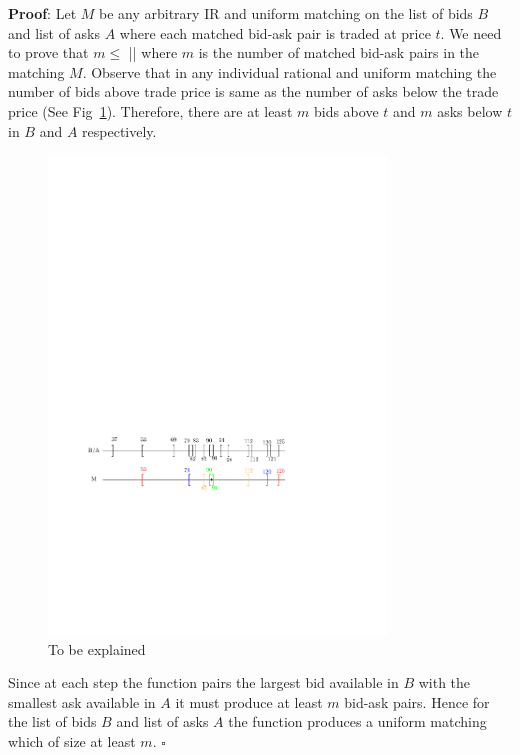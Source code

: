 \documentclass[a4paper,UKenglish,cleveref, autoref]{lipics-v2019}
\begin{document}
\textbf{Proof}: Let $M$ be any arbitrary IR and uniform matching on the list of bids $B$ and list of asks $A$ where each matched bid-ask pair is traded at price $t$. We need to prove that $m \leq$ || where $m$ is the number of matched bid-ask pairs in the matching $M$. Observe that in any individual rational and uniform matching the number of bids above  trade price is same as the number of asks below the trade price (See Fig~\ref{fig:UM_match}). Therefore, there are at least $m$ bids above $t$ and $m$ asks below $t$ in $B$ and $A$ respectively. 

\begin{figure}[h!]
\centering
\includegraphics[width=0.8\textwidth]{UM_matching.pdf}
\caption{To be explained}
\label{fig:UM_match}
\end{figure}

Since at each step the function   pairs the largest bid available in $B$ with the smallest ask available in $A$ it must produce  at least $m$ bid-ask pairs. Hence for the list of bids $B$ and list of asks $A$ the function  produces a uniform matching which of size at least $m$. $\square$
\end{document}
